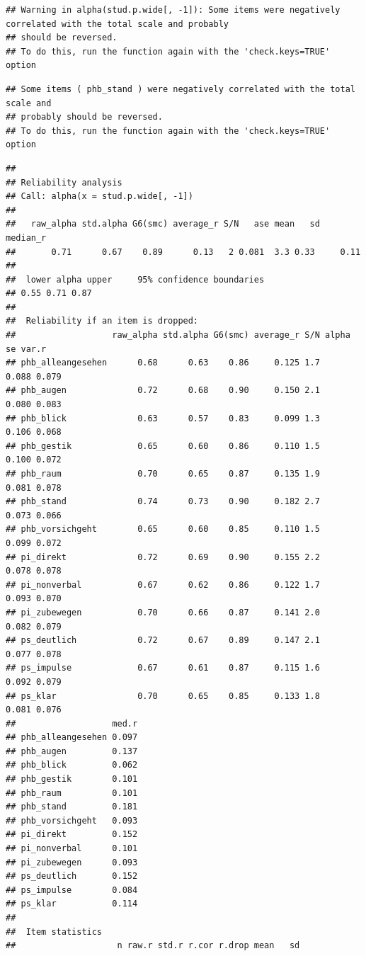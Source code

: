 \documentclass[
  english,
  man,floatsintext]{apa6}
\begin{document}
\begin{verbatim}
## Warning in alpha(stud.p.wide[, -1]): Some items were negatively correlated with the total scale and probably 
## should be reversed.  
## To do this, run the function again with the 'check.keys=TRUE' option
\end{verbatim}

\begin{verbatim}
## Some items ( phb_stand ) were negatively correlated with the total scale and 
## probably should be reversed.  
## To do this, run the function again with the 'check.keys=TRUE' option
\end{verbatim}

\begin{verbatim}
## 
## Reliability analysis   
## Call: alpha(x = stud.p.wide[, -1])
## 
##   raw_alpha std.alpha G6(smc) average_r S/N   ase mean   sd median_r
##       0.71      0.67    0.89      0.13   2 0.081  3.3 0.33     0.11
## 
##  lower alpha upper     95% confidence boundaries
## 0.55 0.71 0.87 
## 
##  Reliability if an item is dropped:
##                   raw_alpha std.alpha G6(smc) average_r S/N alpha se var.r
## phb_alleangesehen      0.68      0.63    0.86     0.125 1.7    0.088 0.079
## phb_augen              0.72      0.68    0.90     0.150 2.1    0.080 0.083
## phb_blick              0.63      0.57    0.83     0.099 1.3    0.106 0.068
## phb_gestik             0.65      0.60    0.86     0.110 1.5    0.100 0.072
## phb_raum               0.70      0.65    0.87     0.135 1.9    0.081 0.078
## phb_stand              0.74      0.73    0.90     0.182 2.7    0.073 0.066
## phb_vorsichgeht        0.65      0.60    0.85     0.110 1.5    0.099 0.072
## pi_direkt              0.72      0.69    0.90     0.155 2.2    0.078 0.078
## pi_nonverbal           0.67      0.62    0.86     0.122 1.7    0.093 0.070
## pi_zubewegen           0.70      0.66    0.87     0.141 2.0    0.082 0.079
## ps_deutlich            0.72      0.67    0.89     0.147 2.1    0.077 0.078
## ps_impulse             0.67      0.61    0.87     0.115 1.6    0.092 0.079
## ps_klar                0.70      0.65    0.85     0.133 1.8    0.081 0.076
##                   med.r
## phb_alleangesehen 0.097
## phb_augen         0.137
## phb_blick         0.062
## phb_gestik        0.101
## phb_raum          0.101
## phb_stand         0.181
## phb_vorsichgeht   0.093
## pi_direkt         0.152
## pi_nonverbal      0.101
## pi_zubewegen      0.093
## ps_deutlich       0.152
## ps_impulse        0.084
## ps_klar           0.114
## 
##  Item statistics 
##                    n raw.r std.r r.cor r.drop mean   sd

\end{verbatim}
\end{document}
